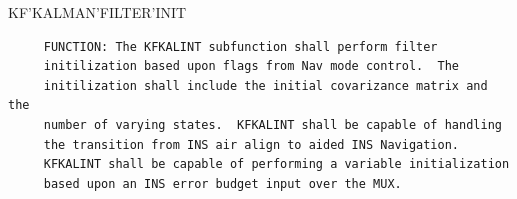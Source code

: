 \begin{frame}
KF'KALMAN'FILTER'INIT
\begin{verbatim}
     FUNCTION: The KFKALINT subfunction shall perform filter
     initilization based upon flags from Nav mode control.  The
     initilization shall include the initial covarizance matrix and the
     number of varying states.  KFKALINT shall be capable of handling
     the transition from INS air align to aided INS Navigation.
     KFKALINT shall be capable of performing a variable initialization
     based upon an INS error budget input over the MUX.


\end{verbatim}
\end{frame}
